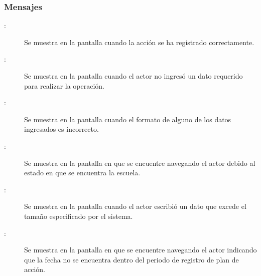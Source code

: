 \subsubsection{Mensajes}

\begin{description}
	\item[:] Se muestra en la pantalla  cuando la acción se ha registrado correctamente.
	\item[:] Se muestra en la pantalla  cuando el actor no ingresó un dato requerido para realizar la operación.
	\item[:] Se muestra en la pantalla  cuando el formato de alguno de los datos ingresados es incorrecto.
	\item[:] Se muestra en la pantalla en que se encuentre navegando el actor debido al estado en que se encuentra la escuela.		
	\item[:] Se muestra en la pantalla  cuando el actor escribió un dato que excede el tamaño especificado por el sistema.
	\item[:] Se muestra en la pantalla en que se encuentre navegando el actor indicando que la fecha no se encuentra dentro del periodo de registro de plan de acción.
	
\end{description}
